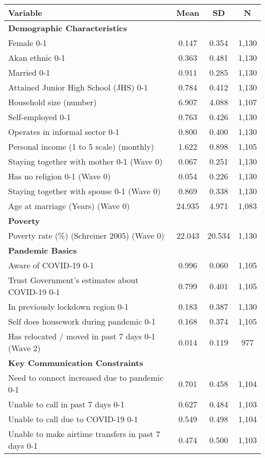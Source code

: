 \begin{tabular}{lccc}
\hline
Variable & Mean & SD & N \\
\hline\hline
\textbf{Demographic Characteristics} & & & \\ 
Female 0-1 & 0.147 & 0.354 & 1,130 \\ 
Akan ethnic 0-1 & 0.363 & 0.481 & 1,130 \\ 
Married 0-1 & 0.911 & 0.285 & 1,130 \\ 
Attained Junior High School (JHS) 0-1 & 0.784 & 0.412 & 1,130 \\ 
Household size (number) & 6.907 & 4.088 & 1,107 \\ 
Self-employed 0-1 & 0.763 & 0.426 & 1,130 \\ 
Operates in informal sector 0-1 & 0.800 & 0.400 & 1,130 \\ 
Personal income (1 to 5 scale) (monthly) & 1.622 & 0.898 & 1,105 \\ 
Staying together with mother 0-1 (Wave 0) & 0.067 & 0.251 & 1,130 \\ 
Has no religion 0-1 (Wave 0) & 0.054 & 0.226 & 1,130 \\ 
Staying together with spouse 0-1 (Wave 0) & 0.869 & 0.338 & 1,130 \\ 
Age at marriage (Years) (Wave 0) & 24.935 & 4.971 & 1,083 \\ 
\textbf{Poverty} & & & \\ 
Poverty rate (\%) (Schreiner 2005) (Wave 0) & 22.043 & 20.534 & 1,130 \\ 
\textbf{Pandemic Basics} & & & \\ 
Aware of COVID-19 0-1 & 0.996 & 0.060 & 1,105 \\ 
Trust Government's estimates about COVID-19 0-1 & 0.799 & 0.401 & 1,105 \\ 
In previously lockdown region 0-1 & 0.183 & 0.387 & 1,130 \\ 
Self does housework during pandemic 0-1 & 0.168 & 0.374 & 1,105 \\ 
Has relocated / moved in past 7 days 0-1 (Wave 2) & 0.014 & 0.119 & 977 \\ 
\textbf{Key Communication Constraints} & & & \\ 
Need to connect increased due to pandemic 0-1 & 0.701 & 0.458 & 1,104 \\ 
Unable to call in past 7 days 0-1 & 0.627 & 0.484 & 1,103 \\ 
Unable to call due to COVID-19 0-1 & 0.549 & 0.498 & 1,104 \\ 
Unable to make airtime transfers in past 7 days 0-1 & 0.474 & 0.500 & 1,103 \\ 

\end{tabular}

